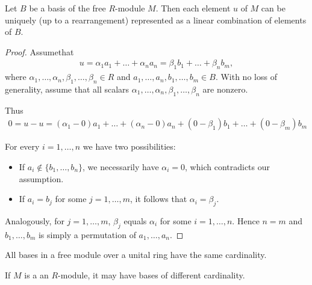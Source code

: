 \begin{proposition}\label{def:module_basis_decomposition}
  Let \( B \) be a basis of the free \( R \)-module \( M \). Then each element \( u \) of \( M \) can be uniquely (up to a rearrangement) represented as a linear combination of elements of \( B \).
\end{proposition}
\begin{proof}
  Assume\LEM that
  \begin{align*}
    u = \alpha_1 a_1 + \ldots + \alpha_n a_n = \beta_1 b_1 + \ldots + \beta_n b_m,
  \end{align*}
  where \( \alpha_1, \ldots, \alpha_n, \beta_1, \ldots, \beta_n \in R \) and \( a_1, \ldots, a_n, b_1, \ldots, b_m \in B \). With no loss of generality, assume that all scalars \( \alpha_1, \ldots, \alpha_n, \beta_1, \ldots, \beta_n \) are nonzero.

  Thus
  \begin{align*}
    0 = u - u = (\alpha_1 - 0) a_1 + \ldots + (\alpha_n - 0) a_n + (0 - \beta_1) b_1 + \ldots + (0 - \beta_m) b_m
  \end{align*}

  For every \( i = 1, \ldots, n \) we have two possibilities:
  \begin{itemize}
    \item If \( a_i \not\in \{ b_1, \ldots, b_n \} \), we necessarily have \( \alpha_i = 0 \), which contradicts our assumption.
    \item If \( a_i = b_j \) for some \( j = 1, \ldots, m \), it follows that \( \alpha_i = \beta_j \).
  \end{itemize}

  Analogously, for \( j = 1, \ldots, m \), \( \beta_j \) equals \( \alpha_i \) for some \( i = 1, \ldots, n \). Hence \( n = m \) and \( b_1, \ldots, b_m \) is simply a permutation of \( a_1, \ldots, a_n \).
\end{proof}

\begin{proposition}\label{thm:free_module_basis_cardinality}\cite{ProofWiki:bases_of_free_module_have_same_cardinality}
  All bases in a free module over a unital ring have the same cardinality.
\end{proposition}

\begin{example}\label{ex:free_module_with_non_equinumerous_bases}
  If \( M \) is a an \( R \)-module, it may have bases of different cardinality.
\end{example}


